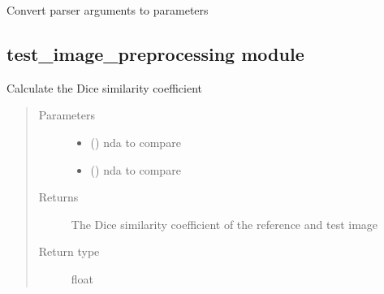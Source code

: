 \documentclass[letterpaper,10pt,english]{sphinxmanual}
\begin{document}
\begin{fulllineitems}
\label{\detokenize{test:conftest.pytest_generate_tests}}
\sphinxAtStartPar
Convert parser arguments to parameters

\end{fulllineitems}



\subsection{test\_image\_preprocessing module}
\label{\detokenize{test:module-test_image_preprocessing}}\label{\detokenize{test:test-image-preprocessing-module}}

\begin{fulllineitems}
\label{\detokenize{test:test_image_preprocessing.DSC}}
\sphinxAtStartPar
Calculate the Dice similarity coefficient
\begin{quote}\begin{description}
\item[{Parameters}] \leavevmode\begin{itemize}
\item {} 
\sphinxAtStartPar
{} () \textendash{} nda to compare

\item {} 
\sphinxAtStartPar
{} () \textendash{} nda to compare

\end{itemize}

\item[{Returns}] \leavevmode
\sphinxAtStartPar
The Dice similarity coefficient of the reference and test image

\item[{Return type}] \leavevmode
\sphinxAtStartPar
float

\end{description}\end{quote}

\end{fulllineitems}
\end{document}
